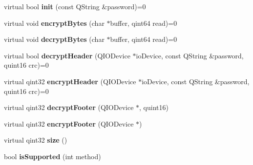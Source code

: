 \begin{DoxyCompactItemize}
\item 
virtual bool {\bfseries init} (const Q\+String \&password)=0\hypertarget{class_encryption_a97865cc44363acccea82f66499222462}{}\label{class_encryption_a97865cc44363acccea82f66499222462}

\item 
virtual void {\bfseries encrypt\+Bytes} (char $\ast$buffer, qint64 read)=0\hypertarget{class_encryption_aaa63ade9c7b6283b919412da922df134}{}\label{class_encryption_aaa63ade9c7b6283b919412da922df134}

\item 
virtual void {\bfseries decrypt\+Bytes} (char $\ast$buffer, qint64 read)=0\hypertarget{class_encryption_ab467f304d2704fb3c77b54f7ed83759b}{}\label{class_encryption_ab467f304d2704fb3c77b54f7ed83759b}

\item 
virtual bool {\bfseries decrypt\+Header} (Q\+I\+O\+Device $\ast$io\+Device, const Q\+String \&password, quint16 crc)=0\hypertarget{class_encryption_ac11a58aa3489c5e0fbb6bdce79210e0a}{}\label{class_encryption_ac11a58aa3489c5e0fbb6bdce79210e0a}

\item 
virtual qint32 {\bfseries encrypt\+Header} (Q\+I\+O\+Device $\ast$io\+Device, const Q\+String \&password, quint16 crc)=0\hypertarget{class_encryption_a6410d06ffe65c05c5a83e44432d4718f}{}\label{class_encryption_a6410d06ffe65c05c5a83e44432d4718f}

\item 
virtual qint32 {\bfseries decrypt\+Footer} (Q\+I\+O\+Device $\ast$, quint16)\hypertarget{class_encryption_a4d082b62c244d6e0d726e1f9e1ab5fed}{}\label{class_encryption_a4d082b62c244d6e0d726e1f9e1ab5fed}

\item 
virtual qint32 {\bfseries encrypt\+Footer} (Q\+I\+O\+Device $\ast$)\hypertarget{class_encryption_a8c6c320ee22e285595fccbba86fdf260}{}\label{class_encryption_a8c6c320ee22e285595fccbba86fdf260}

\item 
virtual qint32 {\bfseries size} ()\hypertarget{class_encryption_a92ae68c7ab8c90d73444f1ca691d3d24}{}\label{class_encryption_a92ae68c7ab8c90d73444f1ca691d3d24}

\item 
bool {\bfseries is\+Supported} (int method)\hypertarget{class_encryption_ab1d23252ee899aa477803502fc4586be}{}\label{class_encryption_ab1d23252ee899aa477803502fc4586be}

\end{DoxyCompactItemize}

